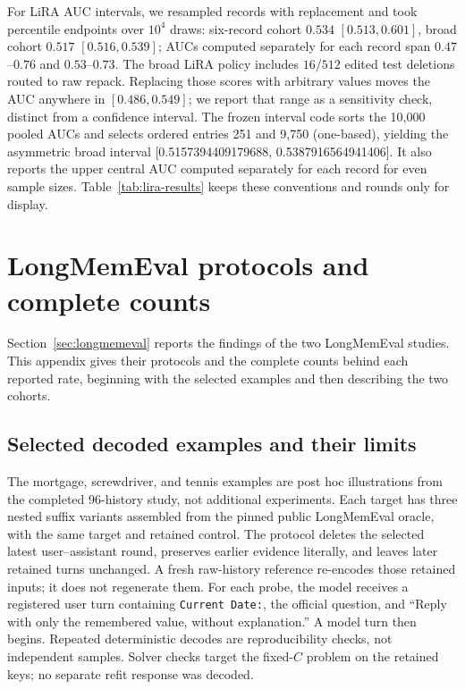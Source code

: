 For LiRA AUC intervals, we resampled records with replacement and took
percentile endpoints over \(10^4\) draws: six-record
cohort \(0.534\) \([0.513, 0.601]\), broad cohort \(0.517\)
\([0.516, 0.539]\); AUCs computed separately for each record span \(0.47\)--\(0.76\) and
\(0.53\)--\(0.73\). The broad LiRA policy includes
\(16/512\) edited test deletions routed to raw repack. Replacing those scores
with arbitrary values moves the AUC anywhere in \([0.486,0.549]\); we report
that range as a sensitivity check, distinct from a confidence interval.
The frozen interval code sorts the 10,000 pooled AUCs and selects ordered
entries 251 and 9,750 (one-based), yielding the asymmetric broad interval
[0.5157394409179688, 0.5387916564941406]. It also reports the upper central
AUC computed separately for each record for even sample sizes. Table~\ref{tab:lira-results} keeps
these conventions and rounds only for display.

\section{LongMemEval protocols and complete counts}\label{app:longmemeval}

Section~\ref{sec:longmemeval} reports the findings of the two LongMemEval
studies. This appendix gives their protocols and the complete counts behind
each reported rate, beginning with the selected examples and then describing
the two cohorts.

\subsection{Selected decoded examples and their limits}\label{app:decoded-cases}

The mortgage, screwdriver, and tennis examples are post hoc illustrations
from the completed 96-history study, not additional experiments. Each target
has three nested suffix variants assembled from the pinned public LongMemEval
oracle, with the same target and retained control. The protocol deletes the
selected latest user--assistant round, preserves earlier evidence literally,
and leaves later retained turns unchanged. A fresh raw-history reference
re-encodes those retained inputs; it does not regenerate them. For each probe,
the model receives a registered user turn containing \texttt{Current Date:},
the official question, and ``Reply with only the remembered value, without
explanation.'' A model turn then begins. Repeated deterministic decodes are
reproducibility checks, not independent samples. Solver checks target the
fixed-$C$ problem on the retained keys; no separate refit response was decoded.

